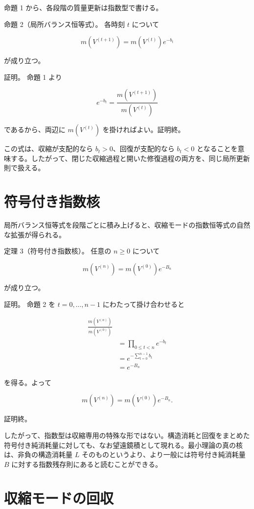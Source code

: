 \documentclass[12pt,a4paper]{article}
\begin{document}
命題 1 から、各段階の質量更新は指数型で書ける。

命題 2（局所バランス恒等式）。 各時刻 \(t\) について

\[
m(V^{(t+1)}) = m(V^{(t)}) e^{-b_{t}}
\]

が成り立つ。

証明。 命題 1 より

\[
e^{-b_{t}} = \frac{m(V^{(t+1)})}{m(V^{(t)})}
\]

であるから、両辺に \(m(V^{(t)})\) を掛ければよい。証明終。

この式は、収縮が支配的なら \(b_{t} > 0\)、回復が支配的なら \(b_{t} < 0\) となることを意味する。したがって、閉じた収縮過程と開いた修復過程の両方を、同じ局所更新則で扱える。

\section{符号付き指数核}\label{ux7b26ux53f7ux4ed8ux304dux6307ux6570ux6838}

局所バランス恒等式を段階ごとに積み上げると、収縮モードの指数恒等式の自然な拡張が得られる。

定理 3（符号付き指数核）。 任意の \(n \ge 0\) について

\[
m(V^{(n)}) = m(V^{(0)}) e^{-B_{n}}
\]

が成り立つ。

証明。 命題 2 を \(t=0,\dots,n-1\) にわたって掛け合わせると

\[
\begin{aligned}
\frac{m(V^{(n)})}{m(V^{(0)})} \\
&= \prod_{0\le t<n} e^{-b_{t}} \\
&= e^{-\sum_{t=0}^{n-1} b_{t}} \\
&= e^{-B_{n}}
\end{aligned}
\]

を得る。よって

\[
m(V^{(n)}) = m(V^{(0)}) e^{-B_{n}}.
\]

証明終。

したがって、指数型は収縮専用の特殊な形ではない。構造消耗と回復をまとめた符号付き純消耗量に対しても、なお望遠鏡積として現れる。最小理論の真の核は、非負の構造消耗量 \(L\) そのものというより、より一般には符号付き純消耗量 \(B\) に対する指数残存則にあると読むことができる。

\section{収縮モードの回収}\label{ux53ceux7e2eux30e2ux30fcux30c9ux306eux56deux53ce}
\end{document}

